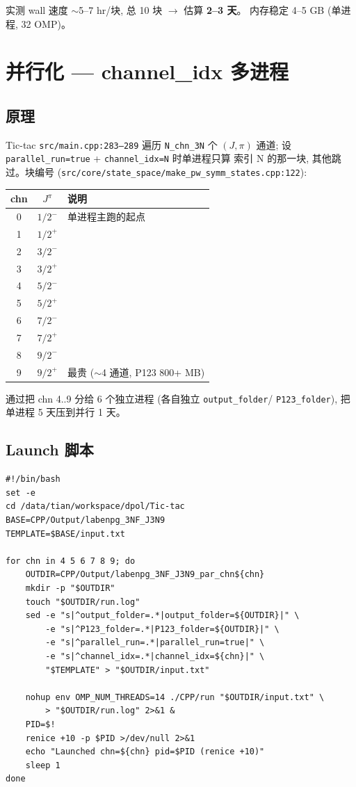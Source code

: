 \documentclass[11pt,a4paper]{article}
\begin{document}
实测 wall 速度 $\sim$5--7 hr/块, 总 10 块 $\to$ 估算 \textbf{2--3 天}。
内存稳定 4--5 GB (单进程, 32 OMP)。

\section{并行化 — channel\_idx 多进程}

\subsection{原理}

Tic-tac \texttt{src/main.cpp:283--289} 遍历 \texttt{N\_chn\_3N} 个 $(J,\pi)$
通道; 设 \texttt{parallel\_run=true} + \texttt{channel\_idx=N} 时单进程只算
索引 N 的那一块, 其他跳过。块编号 (\texttt{src/core/state\_space/make\_pw\_symm\_states.cpp:122}):

\begin{tabularx}{\linewidth}{ccX}
\toprule
chn & $J^\pi$ & 说明 \\
\midrule
0 & $1/2^-$ & 单进程主跑的起点 \\
1 & $1/2^+$ & \\
2 & $3/2^-$ & \\
3 & $3/2^+$ & \\
4 & $5/2^-$ & \\
5 & $5/2^+$ & \\
6 & $7/2^-$ & \\
7 & $7/2^+$ & \\
8 & $9/2^-$ & \\
9 & $9/2^+$ & 最贵 ($\sim$4 通道, P123 800+ MB) \\
\bottomrule
\end{tabularx}

通过把 chn 4..9 分给 6 个独立进程 (各自独立 \texttt{output\_folder}/
\texttt{P123\_folder}), 把单进程 5 天压到并行 1 天。

\subsection{Launch 脚本}

\begin{lstlisting}[caption={launch\_3nf\_parallel.sh — 一次性启 6 个并行 chn}]
#!/bin/bash
set -e
cd /data/tian/workspace/dpol/Tic-tac
BASE=CPP/Output/labenpg_3NF_J3N9
TEMPLATE=$BASE/input.txt

for chn in 4 5 6 7 8 9; do
    OUTDIR=CPP/Output/labenpg_3NF_J3N9_par_chn${chn}
    mkdir -p "$OUTDIR"
    touch "$OUTDIR/run.log"
    sed -e "s|^output_folder=.*|output_folder=${OUTDIR}|" \
        -e "s|^P123_folder=.*|P123_folder=${OUTDIR}|" \
        -e "s|^parallel_run=.*|parallel_run=true|" \
        -e "s|^channel_idx=.*|channel_idx=${chn}|" \
        "$TEMPLATE" > "$OUTDIR/input.txt"

    nohup env OMP_NUM_THREADS=14 ./CPP/run "$OUTDIR/input.txt" \
        > "$OUTDIR/run.log" 2>&1 &
    PID=$!
    renice +10 -p $PID >/dev/null 2>&1
    echo "Launched chn=${chn} pid=$PID (renice +10)"
    sleep 1
done
\end{lstlisting}
\end{document}
